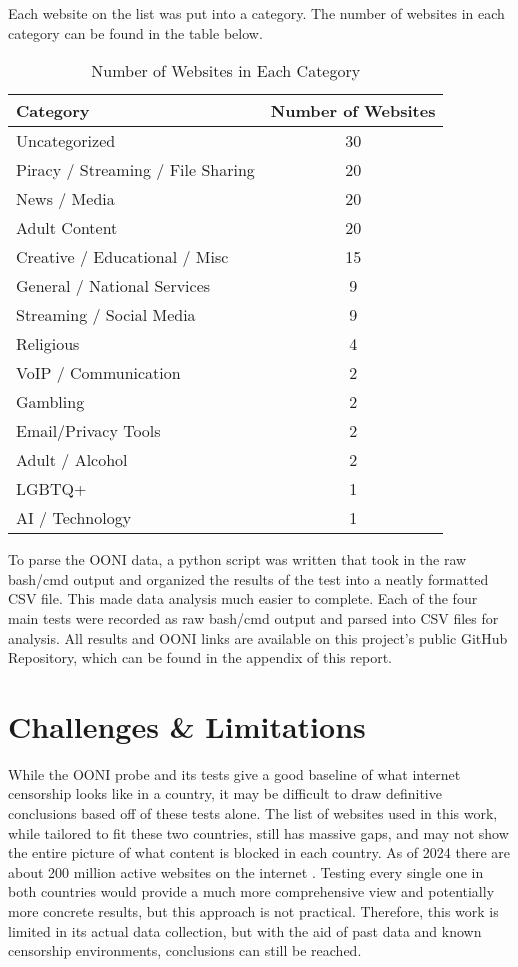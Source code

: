 Each website on the list was put into a category. The number of websites in each category can be found in the table below.

\begin{table}[H]
\centering
\caption{Number of Websites in Each Category}
\begin{tabular}{lc}
\toprule
\textbf{Category} & \textbf{Number of Websites} \\
\midrule
Uncategorized & 30 \\
Piracy / Streaming / File Sharing & 20 \\
News / Media & 20 \\
Adult Content & 20 \\
Creative / Educational / Misc & 15 \\
General / National Services & 9 \\
Streaming / Social Media & 9 \\
Religious & 4 \\
VoIP / Communication & 2 \\
Gambling & 2 \\
Email/Privacy Tools & 2 \\
Adult / Alcohol & 2 \\
LGBTQ+ & 1 \\
AI / Technology & 1 \\
\bottomrule
\end{tabular}
\label{tab:website_category_amount}
\end{table}

To parse the OONI data, a python script was written that took in the raw bash/cmd output and organized the results of the test into a neatly formatted CSV file. This made data analysis much easier to complete. Each of the four main tests were recorded as raw bash/cmd output and parsed into CSV files for analysis. All results and OONI links are available on this project's public GitHub Repository, which can be found in the appendix of this report.

\section{Challenges \& Limitations}

While the OONI probe and its tests give a good baseline of what internet censorship looks like in a country, it may be difficult to draw definitive conclusions based off of these tests alone. The list of websites used in this work, while tailored to fit these two countries, still has massive gaps, and may not show the entire picture of what content is blocked in each country. As of 2024 there are about 200 million active websites on the internet \cite{digitalsilkManyWebsites}. Testing every single one in both countries would provide a much more comprehensive view and potentially more concrete results, but this approach is not practical. Therefore, this work is limited in its actual data collection, but with the aid of past data and known censorship environments, conclusions can still be reached.



